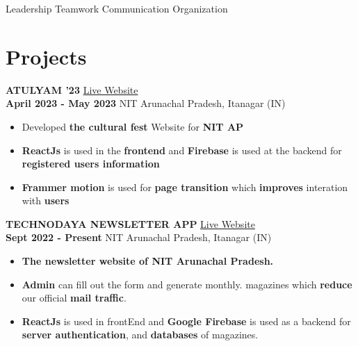 \documentclass[]{article}
\newenvironment{tightemize}{
\vspace{-\topsep}
\begin{itemize}\itemsep0pt \parskip2pt \parsep2pt}
{\end{itemize}}
\newcommand{\upper}[1]{
  \MakeUppercase{#1}
}
\newcommand{\projname}[2]{
  {\large{#1}
  \hfill \small{#2}} 
}
\newcommand{\loc}[2]{
  {\small{#1} 
  \hfill \small{#2}}
}
\begin{document}
\begin{multicols}{2}
\begin{flushleft}
    Leadership \textbullet{} Teamwork \textbullet{} Communication \textbullet{} Organization




    \section*{Projects}
    
    \projname{\textbf{\upper{{Atulyam '23}}}}{\href{http://atulyam23.com/}{Live Website}} \\
    \loc{{\textbf{April 2023 - May 2023}}}{NIT Arunachal Pradesh, Itanagar (IN)}
    \begin{tightemize}
      \item  Developed \textbf{the cultural fest} Website for   \textbf{NIT AP}
      \item  \textbf{ReactJs} is used in the \textbf{frontend} and \textbf{Firebase} is used at
      the backend for \textbf{registered users information} 
      \item   \textbf{Frammer motion } is used for \textbf{page transition} which
      \textbf{improves} interation with  \textbf{users}
    \end{tightemize} 


    \projname{\textbf{\upper{{Technodaya Newsletter App}}}}{\href{https://technodaya.netlify.app/}{Live Website}} \\
    \loc{{\textbf{Sept 2022 - Present}}}{NIT Arunachal Pradesh, Itanagar (IN)}
    \begin{tightemize}
      \item   \textbf{The newsletter website of NIT Arunachal Pradesh.}
      \item   \textbf{Admin} can fill out the form and generate monthly.
      magazines which \textbf{reduce} our official \textbf{mail traffic}.
      \item   \textbf{ReactJs} is used in frontEnd and \textbf{ Google Firebase} is used as a
      backend for \textbf{server authentication}, and \textbf{databases} of magazines.
    \end{tightemize}


\end{flushleft}
\end{multicols}
\end{document}
